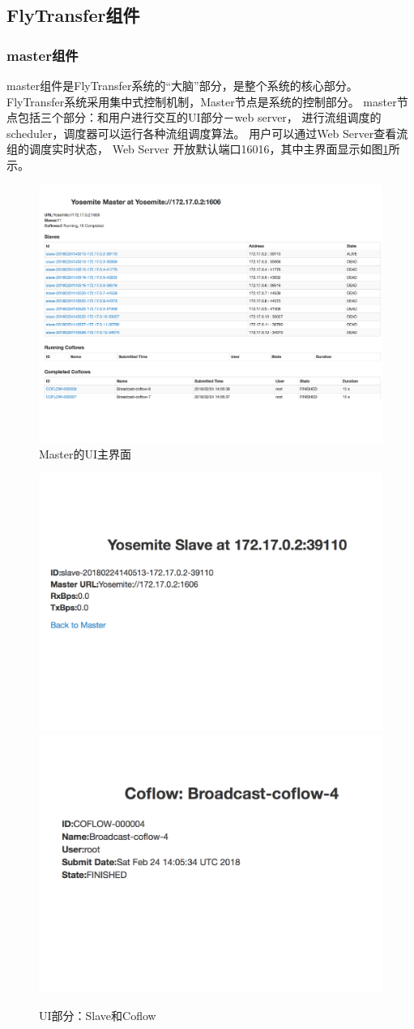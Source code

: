 \subsection{FlyTransfer组件}
\subsubsection{master组件}
master组件是FlyTransfer系统的“大脑”部分，是整个系统的核心部分。
FlyTransfer系统采用集中式控制机制，Master节点是系统的控制部分。
master节点包括三个部分：和用户进行交互的UI部分－web server，
进行流组调度的scheduler，调度器可以运行各种流组调度算法。
用户可以通过Web Server查看流组的调度实时状态，
Web Server 开放默认端口16016，其中主界面显示如图\ref{Yosemite-Master-fig}所示。
\begin{figure}[b]
\begin{center}
\includegraphics [width=0.8\columnwidth] {figures/Yosemite/figs/system/YosmiteMaster.pdf}
\caption{Master的UI主界面}
\label{Yosemite-Master-fig}
\end{center}
\end{figure}
\begin{figure}[h]
\centering
{}
 {\includegraphics[width=0.48\columnwidth]{figures/Yosemite/figs/system/YosemiteSlave.pdf}}
{\includegraphics[width=0.48\columnwidth]{figures/Yosemite/figs/system/YosemiteCoflow.pdf}}
\caption{UI部分：Slave和Coflow}
\label{Yosemite-Salve-Coflow-fig}
\end{figure}

